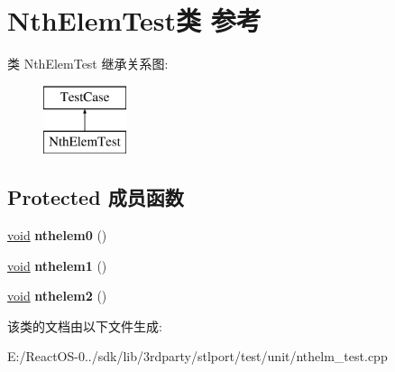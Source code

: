 \hypertarget{class_nth_elem_test}{}\section{Nth\+Elem\+Test类 参考}
\label{class_nth_elem_test}
类 Nth\+Elem\+Test 继承关系图\+:\begin{figure}[H]
\begin{center}
\leavevmode
\includegraphics[height=2.000000cm]{class_nth_elem_test}
\end{center}
\end{figure}
\subsection*{Protected 成员函数}
\begin{DoxyCompactItemize}
\item 
\mbox{\label{class_nth_elem_test_a082ab26c83ca4118196afd4fa700d6b1}} 
\hyperlink{interfacevoid}{void} {\bfseries nthelem0} ()
\item 
\mbox{\label{class_nth_elem_test_ae3ac545487db020e0cd5d816655bfa33}} 
\hyperlink{interfacevoid}{void} {\bfseries nthelem1} ()
\item 
\mbox{\label{class_nth_elem_test_a38c165a0541bbd63ce4d9af9674c2677}} 
\hyperlink{interfacevoid}{void} {\bfseries nthelem2} ()
\end{DoxyCompactItemize}


该类的文档由以下文件生成\+:\begin{DoxyCompactItemize}
\item 
E\+:/\+React\+O\+S-\/0../sdk/lib/3rdparty/stlport/test/unit/nthelm\+\_\+test.\+cpp\end{DoxyCompactItemize}
